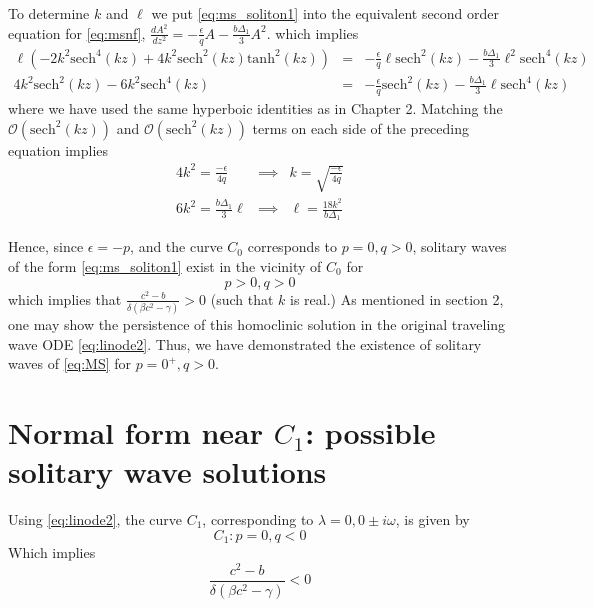 To determine $k$ and $\ell$ we put \eqref{eq:ms_soliton1} into the equivalent second order equation for \eqref{eq:msnf},
$ \frac{dA^2}{dz^2} = -\frac{\epsilon}{q} A - \frac{b \Delta_1}{3} A^2 $. which implies
\begin{subequations}
\begin{eqnarray*}
\ell \left( - 2 k^2 \mathrm{sech}^4(kz) + 4 k^2 \mathrm{sech}^2(kz) \mathrm{tanh}^2(kz) \right) &=& -\frac{\epsilon}{q} \ell \mathrm{sech}^2(kz) - \frac{b \Delta_1}{3} \ell^2 \mathrm{sech}^4(kz) \\
4 k^2 \mathrm{sech}^2(kz) - 6 k^2 \mathrm{sech}^4(kz) &=& -\frac{\epsilon}{q} \mathrm{sech^2}(kz) - \frac{b \Delta_1}{3} \ell \mathrm{sech}^4(kz)
 \end{eqnarray*}
\end{subequations}
where we have used the same hyperboic identities as in Chapter 2.  
Matching the $\mathcal{O}(\mathrm{sech}^2(kz))$ and $\mathcal{O}(\mathrm{sech}^2(kz))$ terms on each side of the preceding equation implies
\begin{subequations}
\begin{eqnarray}
4k^2 = \frac{-\epsilon}{4q} &\implies& k = \sqrt{\frac{-\epsilon}{4q}}  \\
6 k^2 =  \frac{b \Delta_1}{3} \ell &\implies& \ell = \frac{18 k^2}{ b \Delta_1 }
 \end{eqnarray}
\end{subequations}

Hence, since $\epsilon = - p $, and the curve $C_0$ corresponds to $p=0,q>0$, solitary waves of the 
form \eqref{eq:ms_soliton1} exist in the vicinity of $C_0$ for 
\begin{equation}
p > 0, q > 0 
\end{equation}
which implies that $  \frac{c^2 - b}{\delta\left(\beta c^2 - \gamma\right)} > 0 $
(such that $k$  is real.)  As mentioned in section 2, one may show the persistence
of this homoclinic solution in the original traveling wave ODE \eqref{eq:linode2}. Thus, we have 
demonstrated the existence of solitary waves of \eqref{eq:MS} for $p=0^+, q>0$. 

\section{Normal form near $C_1$: possible solitary wave solutions}
Using \eqref{eq:linode2}, the curve $C_1$, corresponding to $\lambda = 0, 0\pm i \omega$, is given by
\begin{equation}\label{eq:ms_c1}
C_1 : { p = 0, q < 0 }
\end{equation}
Which implies
\begin{equation}
\frac{c^2 - b}{ \delta\left(\beta c^2 - \gamma \right)} < 0
\end{equation}

